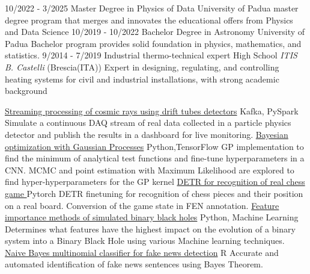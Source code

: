 \documentclass[9pt]{developercv} %
\begin{document}
\vspace{-10 pt}
\begin{entrylist}
    \entry
		{10/2022 - 3/2025}
		{Master Degree in Physics of Data }
		{University of Padua}
		{master degree program that merges and innovates the educational offers from Physics and Data Science}
    \entry
		{10/2019 - 10/2022}
		{Bachelor Degree in Astronomy}
		{University of Padua}
		{Bachelor program provides solid foundation in physics, mathematics, and statistics.}
	\entry
		{9/2014 - 7/2019}
		{Industrial thermo-technical expert}
		{High School \textit{ITIS B. Castelli} (Brescia(ITA))}
		{Expert in designing, regulating, and controlling heating systems for civil and industrial installations, with strong academic background}
	
\end{entrylist}


\begin{entrylist}
    \entry
		{}
		{\href{https://github.com/bhroben/Streaming-processing-of-cosmic-rays-using-drift-tubes-detectors}{Streaming processing of cosmic rays using drift tubes detectors}}
		{Kafka, PySpark}
		{
         Simulate a continuous DAQ stream of real data collected in a particle physics detector and publish the results in a dashboard for live monitoring.}
    \entry
		{}
		{\href{https://github.com/bhroben/Bayesian-Optimization-with-Gaussian-Process}{Bayesian optimization with Gaussian Processes}}
		{Python,TensorFlow}
		{%
       GP implementation to find the minimum of analytical test functions and fine-tune hyperparameters in a CNN. MCMC and point estimation with Maximum Likelihood are explored to find hyper-hyperparameters for the GP kernel}
    \entry
        {}
        {\href{https://github.com/bhroben/DETR-for-recognition-of-real-chess-game}{DETR for recognition of real chess game }}
        {Pytorch}
        {%
       DETR finetuning for recognition of chess pieces and their position on a real board. Conversion of the game state in FEN annotation.}
    \entry
		{}
		{\href{https://github.com/bhroben/Feature-importance-methods-of-simulated-binary-black-holes}{Feature importance methods of simulated binary black holes}}
		{Python, Machine Learning}
		{%
        Determines what features have the highest impact on the evolution of a binary system into a Binary Black Hole using various Machine learning  techniques.}
	\entry
		{}
		{\href{https://github.com/bhroben/Naive-Bayes-multinomial-classifier-for-fake-news-detection}{Naive Bayes multinomial classifier for fake news detection}}
		{R}
		{%
        Accurate and automated identification of fake news sentences using Bayes Theorem.}

\end{entrylist}
\end{document}
